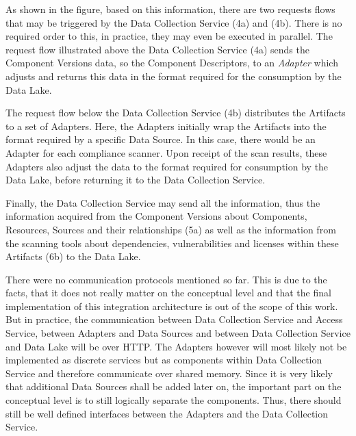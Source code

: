 As shown in the figure, based on this information, there are two requests flows that may be triggered by the Data Collection Service (4a) and (4b). There is no required order to this, in practice, they may even be executed in parallel. The request flow illustrated above the Data Collection Service (4a) sends the Component Versions data, so the Component Descriptors, to an \emph{Adapter} which adjusts and returns this data in the format required for the consumption by the Data Lake.\par 
The request flow below the Data Collection Service (4b) distributes the Artifacts to a set of Adapters. Here, the Adapters initially wrap the Artifacts into the format required by a specific Data Source. In this case, there would be an Adapter for each compliance scanner. Upon receipt of the scan results, these Adapters also adjust the data to the format required for consumption by the Data Lake, before returning it to the Data Collection Service.\par 
Finally, the Data Collection Service may send all the information, thus the information acquired from the Component Versions about Components, Resources, Sources and their relationships (5a) as well as the information from the scanning tools about dependencies, vulnerabilities and licenses within these Artifacts (6b) to the Data Lake.\par
There were no communication protocols mentioned so far. This is due to the facts, that it does not really matter on the conceptual level and that the final implementation of this integration architecture is out of the scope of this work. But in practice, the communication between Data Collection Service and Access Service, between Adapters and Data Sources and between Data Collection Service and Data Lake will be over HTTP. The Adapters however will most likely not be implemented as discrete services but as components within Data Collection Service and therefore communicate over shared memory. Since it is very likely that additional Data Sources shall be added later on, the important part on the conceptual level is to still logically separate the components. Thus, there should still be well defined interfaces between the Adapters and the Data Collection Service.



